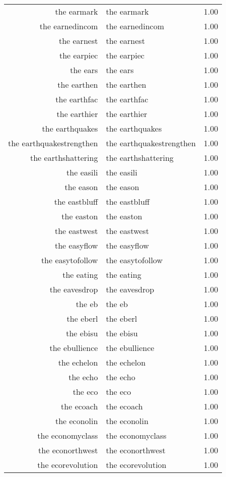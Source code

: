 \begin{table}[ht]
\begin{tabular}{rlr}
  the earmark & the earmark & 1.00 \\ 
  the earnedincom & the earnedincom & 1.00 \\ 
  the earnest & the earnest & 1.00 \\ 
  the earpiec & the earpiec & 1.00 \\ 
  the ears & the ears & 1.00 \\ 
  the earthen & the earthen & 1.00 \\ 
  the earthfac & the earthfac & 1.00 \\ 
  the earthier & the earthier & 1.00 \\ 
  the earthquakes & the earthquakes & 1.00 \\ 
  the earthquakestrengthen & the earthquakestrengthen & 1.00 \\ 
  the earthshattering & the earthshattering & 1.00 \\ 
  the easili & the easili & 1.00 \\ 
  the eason & the eason & 1.00 \\ 
  the eastbluff & the eastbluff & 1.00 \\ 
  the easton & the easton & 1.00 \\ 
  the eastwest & the eastwest & 1.00 \\ 
  the easyflow & the easyflow & 1.00 \\ 
  the easytofollow & the easytofollow & 1.00 \\ 
  the eating & the eating & 1.00 \\ 
  the eavesdrop & the eavesdrop & 1.00 \\ 
  the eb & the eb & 1.00 \\ 
  the eberl & the eberl & 1.00 \\ 
  the ebisu & the ebisu & 1.00 \\ 
  the ebullience & the ebullience & 1.00 \\ 
  the echelon & the echelon & 1.00 \\ 
  the echo & the echo & 1.00 \\ 
  the eco & the eco & 1.00 \\ 
  the ecoach & the ecoach & 1.00 \\ 
  the econolin & the econolin & 1.00 \\ 
  the economyclass & the economyclass & 1.00 \\ 
  the econorthwest & the econorthwest & 1.00 \\ 
  the ecorevolution & the ecorevolution & 1.00 \\ 

\end{tabular}
\end{table}
